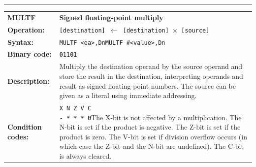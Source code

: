 \documentclass[]{article}
\begin{document}
\begin{appendices}
\noindent\rule{\textwidth}{1pt}\newline %
\setlength\extrarowheight{5pt} %
\begin{tabularx}{\textwidth}{lL}
  {\Large \textbf{MULTF}} 	& {\Large \textbf{Signed floating-point multiply}}\\
  \textbf{Operation:} 		& \texttt{[destination] $\leftarrow$ [destination] $\times$ [source]}\\
  \textbf{Syntax:}  		& \texttt{MULTF <ea>,Dn}\newline\texttt{MULTF \#<value>,Dn}\\
  \textbf{Binary code:} 	& \texttt{01101}\\
  \textbf{Description:}  	& Multiply the destination operand by the source operand and store
the result in the destination, interpreting operands and result as signed floating-point numbers. The source can be given as a literal using immediate addressing.\\
  \textbf{Condition codes:} & \texttt{X N Z V C\newline - * * * 0}\newline\newline The X-bit is not affected by a multiplication. The N-bit is set if the 
product is negative. The Z-bit is set if the product is zero. The V-bit
is set if division overflow occurs (in which case the Z-bit and the N-bit
are undefined). The C-bit is always cleared.\\
\end{tabularx}
\newline

\newpage


\end{appendices}
\end{document}
